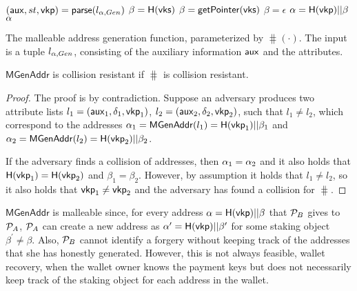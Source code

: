 \begin{algorithm}
    \begin{algorithmic}
            \State $(\mathsf{aux}, st, \mathsf{vkp}) = \mathsf{parse}(l_{\alpha, Gen})$
                    \State $\beta = \mathsf{H}(\mathsf{vks})$
                \EndCase
                    \State $\beta = \mathsf{getPointer}(\mathsf{vks})$
                \EndCase
                    \State $\beta = \epsilon$
                \EndCase
            \EndSwitch
            \State $\alpha = \mathsf{H}(\mathsf{vkp}) || \beta$
            \State \Return $\alpha$
        \EndFunction
    \end{algorithmic}
    \caption{
        The malleable address generation function, parameterized by
        $\hash(\cdot)$. The input is a tuple $l_{\alpha, Gen}$, consisting of
        the auxiliary information $\mathsf{aux}$ and the attributes.
    }
    \label{alg:malleable_addrgen}
\end{algorithm}

\begin{lemma}\label{lem:malleable_addrgen_collision}
    $\mathsf{MGenAddr}$ is collision resistant if $\hash$ is collision
    resistant.
\end{lemma}
\begin{proof}
    The proof is by contradiction. Suppose an adversary produces two attribute
    lists $l_1 = (\mathsf{aux}_1, \delta_1, \mathsf{vkp}_1)$, $l_2 =
    (\mathsf{aux}_2, \delta_2, \mathsf{vkp}_2)$, such that $l_1 \neq l_2$, which
    correspond to the addresses $\alpha_1 = \mathsf{MGenAddr}(l_1) =
    \mathsf{H}(\mathsf{vkp}_1) || \beta_1$ and $\alpha_2 =
    \mathsf{MGenAddr}(l_2) = \mathsf{H}(\mathsf{vkp}_2) || \beta_2$.

    If the adversary finds a collision of addresses, then $\alpha_1 = \alpha_2$
    and it also holds that $\mathsf{H}(\mathsf{vkp}_1) =
    \mathsf{H}(\mathsf{vkp}_2)$ and $\beta_1 = \beta_2$. However, by assumption
    it holds that $l_1 \neq l_2$, so it also holds that $\mathsf{vkp}_1
    \neq \mathsf{vkp}_2$ and the adversary has found a collision for
    $\hash$.
\end{proof}

$\mathsf{MGenAddr}$ is malleable since, for every address $\alpha =
\mathsf{H}(\mathsf{vkp}) || \beta$ that $\mathcal{P}_{B}$ gives to $\mathcal{P}_{A}$,
$\mathcal{P}_{A}$ can create a new address as $\alpha^\prime =
\mathsf{H}(\mathsf{vkp}) || \beta^\prime$ for some staking object $\beta^\prime
\neq \beta$. Also, $\mathcal{P}_{B}$ cannot identify a forgery without keeping track
of the addresses that she has honestly generated. However, this is not always
feasible, \eg wallet recovery, when the wallet owner knows the payment keys but
does not necessarily keep track of the staking object for each address in the
wallet.

